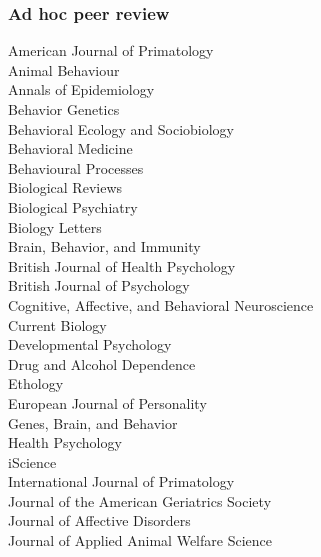 \documentclass[11pt]{article}
\begin{document}
\subsubsection*{Ad hoc peer review}

\begin{minipage}[t]{0.49\linewidth}
American Journal of Primatology \\
Animal Behaviour \\
Annals of Epidemiology \\
Behavior Genetics \\
Behavioral Ecology and Sociobiology \\
Behavioral Medicine \\
Behavioural Processes \\
Biological Reviews \\
Biological Psychiatry \\
Biology Letters \\
Brain, Behavior, and Immunity \\
British Journal of Health Psychology \\
British Journal of Psychology \\
Cognitive, Affective, and Behavioral Neuroscience \\
Current Biology \\
Developmental Psychology \\
Drug and Alcohol Dependence \\
Ethology \\
European Journal of Personality \\
Genes, Brain, and Behavior \\
Health Psychology \\
iScience \\
International Journal of Primatology \\
Journal of the American Geriatrics Society \\
Journal of Affective Disorders \\
Journal of Applied Animal Welfare Science

\end{minipage}
\hfill
\end{document}
